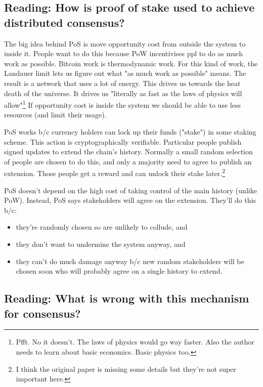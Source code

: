 \documentclass{article}
\begin{document}
\subsection{Reading: How is proof of stake used to achieve distributed consensus?}

The big idea behind PoS is move opportunity cost from outside the system to inside it. People want to do this because PoW incentivises ppl to do as much work as possible. Bitcoin work is thermodynamic work. For this kind of work, the Landauer limit lets us figure out what "as much work as possible" means. The result is a network that uses a lot of energy. This drives us towards the heat death of the universe. It drives us "literally as fast as the laws of physics will allow"\footnote{Pfft. No it doesn't. The laws of physics would go way faster. Also the author needs to learn about basic economics. Basic physics too.} If opportunity cost is inside the system we should be able to use less resources (and limit their usage).

PoS works b/c currency holders can lock up their funds ("stake") in some staking scheme. This action is cryptographically verifiable. Particular people publish signed updates to extend the chain's history. Normally a small random selection of people are chosen to do this, and only a majority need to agree to publish an extension. Those people get a reward and can unlock their stake later.\footnote{I think the original paper is missing some details but they're not super important here.}

PoS doesn't depend on the high cost of taking control of the main history (unlike PoW). Instead, PoS says stakeholders will agree on the extension. They'll do this b/c:
\begin{itemize}
    \item they're randomly chosen so are unlikely to collude, and 
    \item they don't want to undermine the system anyway, and
    \item they can't do much damage anyway b/c new random stakeholders will be chosen soon who will probably agree on a single history to extend.
\end{itemize}

\subsection{Reading: What is wrong with this mechanism for consensus?}
\end{document}

